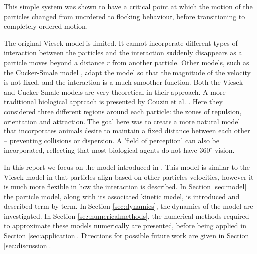 This simple system was shown to have a critical point at which the motion of the particles changed from unordered to flocking behaviour, before transitioning to completely ordered motion. 

The original Vicsek model is limited. It cannot incorporate different types of interaction between the particles and the interaction suddenly disappears as a particle moves beyond a distance $r$ from another particle. Other models, such as the Cucker-Smale model \cite{Cucker07}, adapt the model so that the magnitude of the velocity is not fixed, and the interaction is a much smoother function. Both the Vicsek and Cucker-Smale models are very theoretical in their approach. A more traditional biological approach is presented by Couzin et al. \cite{Couzin02}. Here they considered three different regions around each particle: the zones of repulsion, orientation and attraction. The goal here was to create a more natural model that incorporates animals desire to maintain a fixed distance between each other -- preventing collisions or dispersion. A 'field of perception' can also be incorporated, reflecting that most biological agents do not have $360^{\circ}$ vision.

In this report we focus on the model introduced in \cite{Butta2019}. This model is similar to the Vicsek model in that particles align based on other particles velocities, however it is much more flexible in how the interaction is described. In Section \ref{sec:model} the particle model, along with its associated kinetic model, is introduced and described term by term. In Section \ref{sec:dynamics}, the dynamics of the model are investigated. In Section \ref{sec:numericalmethods}, the numerical methods required to approximate these models numerically are presented, before being applied in Section \ref{sec:application}. Directions for possible future work are given in Section \ref{sec:discussion}.
